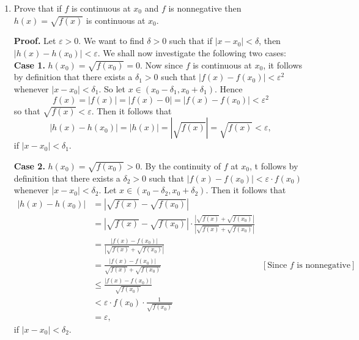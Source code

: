 \documentclass[9pt]{article}
\begin{document}
\begin{enumerate}
   \item Prove that if $f$ is continuous at $x_0$ and $f$ is nonnegative then
         $h(x) = \sqrt{f(x)}$ is continuous at $x_0$.
         
      \textbf{Proof.} Let $\varepsilon > 0$. We want to find $\delta > 0$ such
      that if $|x - x_0| < \delta$, then $|h(x) - h(x_0)| < \varepsilon$. We
      shall now investigate the following two cases: \\
      
      \textbf{Case 1.} $h(x_0) = \sqrt{f(x_0)} = 0$. Now since $f$ is continuous
      at $x_0$, it follows by definition that there exists a $\delta_1 > 0$ such
      that $|f(x) - f(x_0)| < \varepsilon^2$ whenever $|x - x_0| < \delta_1$.
      So let $x \in (x_0 - \delta_1, x_0 + \delta_1)$. Hence
      $$f(x) = |f(x)| = |f(x) - 0| = |f(x) - f(x_0)| < \varepsilon^2$$
      so that $\sqrt{f(x)} < \varepsilon$. Then it follows that
      $$|h(x) - h(x_0)| = |h(x)| = |\sqrt{f(x)}| = \sqrt{f(x)} < \varepsilon,$$
      if $|x - x_0| < \delta_1$.
      
      \textbf{Case 2.} $h(x_0) = \sqrt{f(x_0)} > 0$.  By the continuity of $f$
      at $x_0$, t follows by definition
      that there exists a $\delta_2 > 0$ such that
      $\displaystyle|f(x) - f(x_0)| < \varepsilon \cdot f(x_0)$
      whenever $|x - x_0| < \delta_2$. Let
      $x \in (x_0 - \delta_2, x_0 + \delta_2)$. Then it follows that
      \begin{align*}
         |h(x) - h(x_0)| &= |\sqrt{f(x)} - \sqrt{f(x_0)}| \\
                         &= |\sqrt{f(x)} - \sqrt{f(x_0)}| \cdot
                            \frac{|\sqrt{f(x)} + \sqrt{f(x_0)}|}
                                 {|\sqrt{f(x)} + \sqrt{f(x_0)}|} \\
                         &= \frac{|f(x) - f(x_0)|}
                                 {|\sqrt{f(x)} + \sqrt{f(x_0)}|} \\
                         &= \frac{|f(x) - f(x_0)|}
                                 {\sqrt{f(x)} + \sqrt{f(x_0)}}
                            &[\text{Since }f \text{ is nonnegative}] \\
                         &\le \frac{|f(x) - f(x_0)|}
                                 {\sqrt{f(x_0)}} \\
                         &< \varepsilon \cdot f(x_0) \cdot
                            \frac{1}{\sqrt{f(x_0)}} \\
                         &= \varepsilon,
      \end{align*}
      if $|x - x_0| < \delta_2$. \\
      

\end{enumerate}
\end{document}
